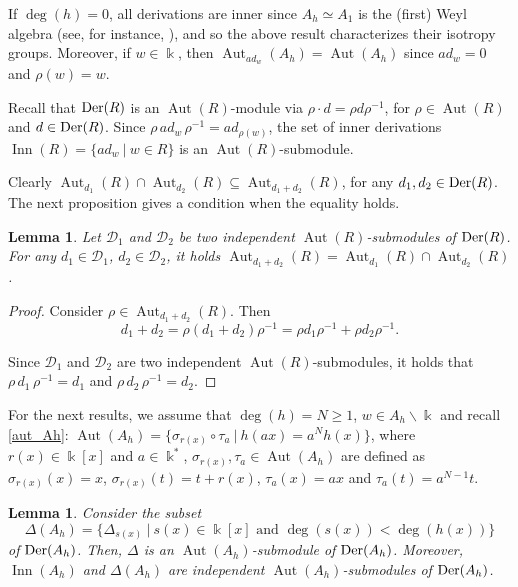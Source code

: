 \documentclass{article}
\numberwithin{equation}{section}\theoremstyle{plain}
\newtheorem{lemma}[theorem]{Lemma}
\newcommand{\der}{{\rm Der}}
\DeclareMathOperator{\Aut}{Aut}
\DeclareMathOperator{\Inn}{Inn}
\begin{document}
\medbreak 

If $\deg(h)=0$, all derivations are inner since $A_h\simeq A_1$ is the (first) Weyl algebra (see, for instance, \cite[Thm. 9.1]{Nowicki}), and so the above result characterizes their isotropy groups.
Moreover, 
if $w \in \Bbbk$,  then $\Aut_{ad_w}(A_h) = \Aut(A_h)$ since $ad_w=0$ and $\rho(w) = w$.



\medbreak 

 Recall that $\der(R)$ is an $\Aut(R)$-module via $\rho \cdot d = \rho d \rho^{-1}$, for $\rho\in \Aut(R)$ and $d\in \der(R)$. 
Since $\rho \, ad_w \, \rho^{-1} = ad_{\rho(w)}$, the set of inner derivations $\Inn(R) = \{ad_w \ | \ w \in R \}$ is an $\Aut(R)$-submodule. 

Clearly $\Aut_{d_1}(R) \cap \Aut_{d_2}(R) \subseteq \Aut_{d_1+d_2}(R)$, for any $d_1, d_2 \in \der(R)$.
The next proposition gives a condition when the equality holds.

\begin{lemma}\label{independ}
    Let $\mathcal{D}_1$ and $\mathcal{D}_2$ be two independent $\Aut(R)$-submodules of $\der(R)$.
    For any $d_1 \in \mathcal{D}_1$, $d_2 \in \mathcal{D}_2$, it holds $\Aut_{d_1+d_2}(R)=\Aut_{d_1}(R) \cap \Aut_{d_2}(R)$.
\end{lemma}

\begin{proof}
Consider $\rho \in \Aut_{d_1+d_2}(R)$. 
Then 
$$d_1+d_2 = \rho (d_1+d_2)\rho^{-1} = \rho d_1\rho^{-1} + \rho d_2 \rho^{-1}.$$

Since $\mathcal{D}_1$ and $\mathcal{D}_2$ are two independent $\Aut(R)$-submodules, it holds that $\rho \, d_1 \, \rho^{-1} = d_1$ and $\rho \, d_2 \, \rho^{-1}=d_2$.
\end{proof}

\medbreak

For the next results, we assume that $\deg(h) = N\geq 1$, $w \in A_h \backslash \Bbbk$ and recall \eqref{aut_Ah}: $\Aut(A_{h})=\{\sigma_{r(x)}\circ\tau_{a} \ | \ h(ax)=a^Nh(x)\}$, where $r(x)\in\Bbbk[x]$ and $a\in\Bbbk^{*}$, $\sigma_{r(x)}, \tau_a \in \Aut(A_{h})$ are defined as  $\sigma_{r(x)}(x)=x$, $\sigma_{r(x)}(t)=t+r(x)$, $\tau_{a}(x) = ax$ and $\tau_{a}(t) = a^{N-1}t$.

\begin{lemma} \label{lemadelta}
Consider the subset 
$$\Delta(A_h) = \{\Delta_{s(x)} \ | \ s(x) \in \Bbbk[x] \textrm{ and } \deg(s(x)) < \deg(h(x)) \}$$
of $\der(A_h)$.
Then, $\Delta$ is an $\Aut(A_h)$-submodule of $\der(A_h)$.
Moreover, $\Inn(A_h)$ and $\Delta(A_h)$ are independent $\Aut(A_h)$-submodules of $\der(A_h)$.
\end{lemma}
\end{document}
